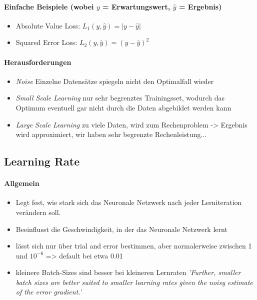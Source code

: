 \paragraph{Einfache Beispiele (wobei $y$ = Erwartungswert, $\hat{y}$ = Ergebnis) \cite{russel-norvig}}
\begin{itemize}
	\item Absolute Value Loss: $L_1(y, \hat{y}) = |y - \hat{y}|$
	\item Squared Error Loss: $L_2(y, \hat{y}) = (y - \hat{y})^2$
\end{itemize}

\paragraph{Herausforderungen \cite[p. 710]{russel-norvig}}
\begin{itemize}
	\item \textit{Noise} 
	Einzelne Datensätze spiegeln nicht den Optimalfall wieder
	
	\item \textit{Small Scale Learning} 
	nur sehr begrenztes Trainingsset, wodurch das Optimum eventuell gar nicht durch die Daten abgebildet werden kann
	
	\item \textit{Large Scale Learning} 
	zu viele Daten, wird zum Rechenproblem -> Ergebnis wird approximiert, wir haben sehr begrenzte Rechenleistung...
\end{itemize}



\subsection{Learning Rate}
\paragraph{Allgemein \cite{learningrate-how-to-configure}}
\begin{itemize}
	\item Legt fest, wie stark sich das Neuronale Netzwerk nach jeder Lerniteration verändern soll.
	\item Beeinflusst die Geschwindigkeit, in der das Neuronale Netzwerk lernt
	\item lässt sich nur über trial and error bestimmen, aber normalerweise zwischen 1 und $10^{-6}$ => default bei etwa 0.01
	\item kleinere Batch-Sizes sind besser bei kleineren Lernraten
	\textit{'Further, smaller batch sizes are better suited to smaller learning rates given the noisy estimate of the error gradient.' \cite{learningrate-how-to-configure}}
\end{itemize}

